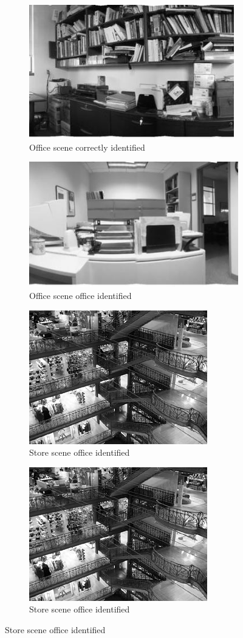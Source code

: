 \begin{homeworkProblem}
\begin{figure}[H]
  \begin{subfigure}{0.5\textwidth}
    \centering
    \caption{Office scene correctly identified}
    \includegraphics[width=.5\linewidth]{./images/5_off.jpg}
  \end{subfigure}%
  \begin{subfigure}{0.5\textwidth}
    \centering
    \caption{Office scene office identified}
    \includegraphics[width=.5\linewidth]{./images/5_ooff.jpg}
  \end{subfigure}
  \begin{subfigure}{0.5\textwidth}
    \centering
    \caption{Store scene office identified}
    \includegraphics[width=.5\linewidth]{./images/6_stor.jpg}
  \end{subfigure}%
  \begin{subfigure}{0.5\textwidth}
    \centering
    \caption{Store scene office identified}
    \includegraphics[width=.5\linewidth]{./images/6_stor.jpg}

\end{subfigure}
\end{figure}
\end{homeworkProblem}
